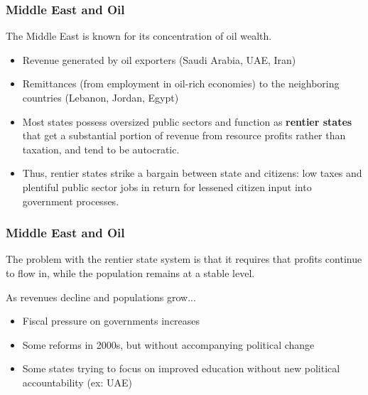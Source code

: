\documentclass{beamer}
\begin{document}



\begin{frame} 
	\frametitle{\LARGE{Middle East and Oil}}
	\begin{itemize}
		\large{
			\item The Middle East is known for its concentration of oil wealth. \pause
			\begin{itemize}
				\item Revenue generated by oil exporters (Saudi Arabia, UAE, Iran) \pause
				\item Remittances (from employment in oil-rich economies) to the neighboring countries (Lebanon, Jordan, Egypt) \pause
				\item Most states possess oversized public sectors and function as \textbf{rentier states} that get a substantial portion of revenue from resource profits rather than taxation, and tend to be autocratic. \pause
				\item Thus, rentier states strike a bargain between state and citizens: low taxes and plentiful public sector jobs in return for lessened citizen input into government processes.
			\end{itemize}
		}
	\end{itemize}
\end{frame}

\begin{frame} 
	\frametitle{\LARGE{Middle East and Oil}}
	\begin{itemize}
		\large{
			\item The problem with the rentier state system is that it requires that profits continue to flow in, while the population remains at a stable level.
			\item As revenues decline and populations grow...\pause
			\begin{itemize}
				\item Fiscal pressure on governments increases \pause
				\item Some reforms in 2000s, but without accompanying political change\pause
				\item Some states trying to focus on improved education without new political accountability (ex: UAE)
			\end{itemize}
		}
	\end{itemize}
\end{frame}
\end{document}
